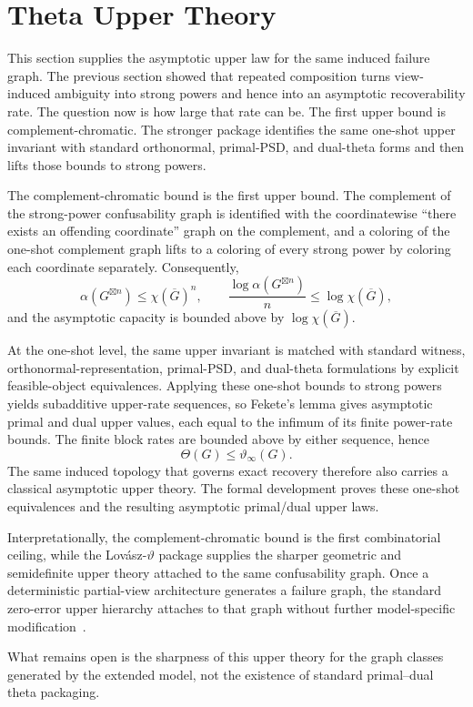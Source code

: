 \section{Theta Upper Theory}\label{sec:theta-theory}


This section supplies the asymptotic upper law for the same induced failure graph. The previous section showed that repeated composition turns view-induced ambiguity into strong powers and hence into an asymptotic recoverability rate. The question now is how large that rate can be. The first upper bound is complement-chromatic. The stronger package identifies the same one-shot upper invariant with standard orthonormal, primal-PSD, and dual-theta forms and then lifts those bounds to strong powers.

The complement-chromatic bound is the first upper bound. The complement of the strong-power confusability graph is identified with the coordinatewise ``there exists an offending coordinate'' graph on the complement, and a coloring of the one-shot complement graph lifts to a coloring of every strong power by coloring each coordinate separately. Consequently,
\[
\alpha(G^{\boxtimes n}) \le \chi(\overline G)^n,
\qquad
\frac{\log \alpha(G^{\boxtimes n})}{n} \le \log \chi(\overline G),
\]
and the asymptotic capacity is bounded above by $\log \chi(\overline G)$.

At the one-shot level, the same upper invariant is matched with standard witness, orthonormal-representation, primal-PSD, and dual-theta formulations by explicit feasible-object equivalences. Applying these one-shot bounds to strong powers yields subadditive upper-rate sequences, so Fekete's lemma gives asymptotic primal and dual upper values, each equal to the infimum of its finite power-rate bounds. The finite block rates are bounded above by either sequence, hence
\[
\Theta(G)\le \vartheta_{\infty}(G).
\]
The same induced topology that governs exact recovery therefore also carries a classical asymptotic upper theory. The formal development proves these one-shot equivalences and the resulting asymptotic primal/dual upper laws.

Interpretationally, the complement-chromatic bound is the first combinatorial ceiling, while the Lov\'asz-$\vartheta$ package supplies the sharper geometric and semidefinite upper theory attached to the same confusability graph. Once a deterministic partial-view architecture generates a failure graph, the standard zero-error upper hierarchy attaches to that graph without further model-specific modification~\cite{lovasz1979shannon,haemers1979upper,cubitt2014bounds,zuiddam2019asymptotic}.

What remains open is the sharpness of this upper theory for the graph classes generated by the extended model, not the existence of standard primal--dual theta packaging.
